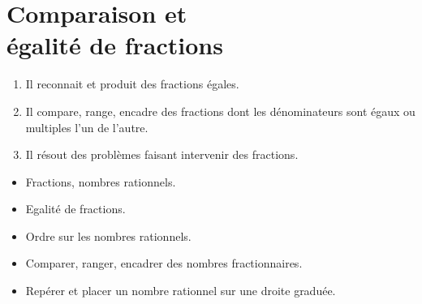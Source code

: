 \themaN
\graphicspath{{../../S14_Comparaison_et_egalite_de_fractions/Images/}}

\chapter{Comparaison et\\égalité de fractions}
\label{S14}


\begin{autoeval}
   \small
   \begin{enumerate}
      \item Il reconnait et produit des fractions égales.
      \item Il compare, range, encadre des fractions dont les dénominateurs sont égaux ou multiples l'un de l'autre.
      \item Il résout des problèmes faisant intervenir des fractions.  
   \end{enumerate}
\end{autoeval}

\begin{prerequis}
   \begin{itemize}
      \item Fractions, nombres rationnels.
      \item Egalité de fractions.
      \item Ordre sur les nombres rationnels.
      \item[\com] Comparer, ranger, encadrer des nombres fractionnaires.
      \item[\com] Repérer et placer un nombre rationnel sur une droite graduée.
   \end{itemize}
\end{prerequis}

\vfill

